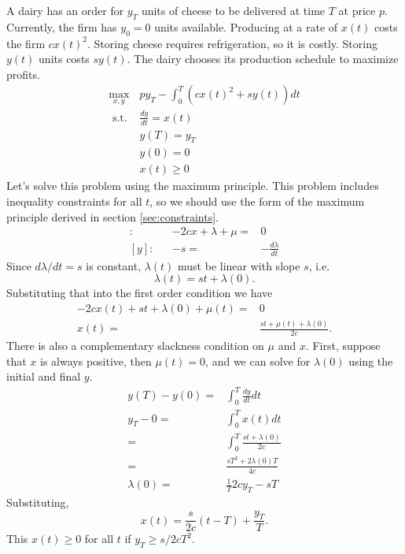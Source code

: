 \begin{example}[Inventory] %
  A dairy has an order for $y_T$ units of cheese to be delivered at
  time $T$ at price $p$. Currently, the firm has $y_0 = 0$ units
  available. Producing at a rate of $x(t)$ costs the firm $c
  x(t)^2$. Storing cheese requires refrigeration, so it is
  costly. Storing $y(t)$ units costs $sy(t)$. The dairy chooses its
  production schedule to maximize profits. 
  \begin{align*}
    \max_{x,y} & p y_T - \int_0^T \left( c x(t)^2  + s y(t) \right)
    dt \\
    \text{ s.t. } 
    & \frac{dy}{dt} = x(t) \\
    & y(T) = y_T \\
    & y(0) = 0 \\
    & x(t) \geq 0 
  \end{align*}
  Let's solve this problem using the maximum principle. This problem
  includes inequality constraints for all $t$, so we should use the
  form of the maximum principle derived in section \ref{sec:constraints}. 
  \begin{align*}
    [x]: && -2cx + \lambda + \mu = & 0 \\
    [y]: && -s = & -\frac{d\lambda}{dt} 
  \end{align*}
  Since $d\lambda/dt = s$ is constant, $\lambda(t)$ must be linear
  with slope $s$, i.e. 
  \[ \lambda(t) = st + \lambda(0). \]
  Substituting that into the first order condition we have
  \begin{align*}
    -2cx(t) + st + \lambda(0) + \mu(t) = & 0 \\
    x(t) = & \frac{st + \mu(t) + \lambda(0)}{2c}.
  \end{align*}
  There is also a complementary slackness condition on $\mu$ and
  $x$. First, suppose
  that $x$ is always positive, then $\mu(t) = 0$, and we can solve for
  $\lambda(0)$ using the initial and final $y$.
  \begin{align*}
    y(T) - y(0) = & \int_0^T \frac{dy}{dt} dt \\
    y_T - 0 = & \int_0^T x(t) dt \\
    = & \int_0^T \frac{st + \lambda(0)}{2c} \\
    = & \frac{sT^2 + 2\lambda(0) T}{4c} \\
    \lambda(0) = & \frac{1}{T} 2c y_T  - sT
  \end{align*}
  Substituting,
  \[ x(t) = \frac{s}{2c}(t-T) + \frac{y_T}{T}. \] This $x(t)
  \geq 0$ for all $t$ if $y_T \geq s/2c T^2$.  


\end{example}
